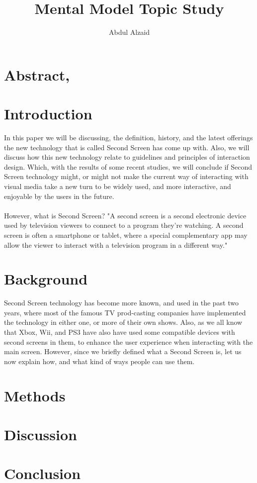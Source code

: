 \documentclass[12pt, oneside]{article}   	%
\title{Mental Model Topic Study}
\author{Abdul Alzaid}
\begin{document}
 \maketitle
  \section{Abstract,}
 \section{Introduction}
In this paper we will be discussing, the definition, history, and the latest offerings the new technology that is called Second Screen has come up with. Also, we will discuss how this new technology relate to guidelines and principles of interaction design. Which, with the results of some recent studies, we will conclude if Second Screen technology might, or might not make the current way of interacting with visual media take a new turn to be widely used, and more interactive, and enjoyable by the users in the future. \paragraph{}
However, what is Second Screen?  "A second screen is a second electronic device used by television viewers to connect to a program they're watching. A second screen is often a smartphone or tablet, where a special complementary app may allow the viewer to interact with a television program in a different way."\cite{Second-Screen-Def}
 \section{Background}
 Second Screen technology has become more known, and used in the past two years, where most of the famous TV prod-casting companies have implemented the technology in either one, or more of their own shows.  Also, as we all know that Xbox, Wii, and PS3 have also have used some compatible devices with second screens in them, to enhance the user experience when interacting with the main screen.
 However, since we briefly defined what a Second Screen is, let us now explain how, and what kind of ways people can use them.  

 \section{Methods} 
 \section{Discussion}
 \section{Conclusion}


 
 

 
 
\end{document}
